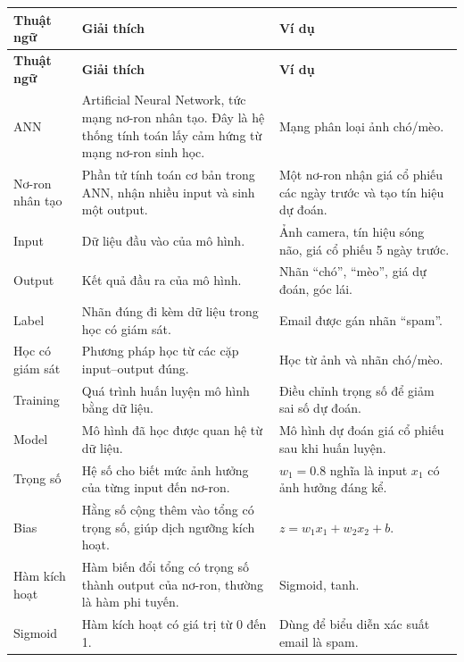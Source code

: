 \small
\begin{longtable}{p{}p{}p{}}
\toprule
\textbf{Thuật ngữ} & \textbf{Giải thích} & \textbf{Ví dụ} \\
\midrule
\endfirsthead

\toprule
\textbf{Thuật ngữ} & \textbf{Giải thích} & \textbf{Ví dụ} \\
\midrule
\endhead

ANN & Artificial Neural Network, tức mạng nơ-ron nhân tạo. Đây là hệ thống tính toán lấy cảm hứng từ mạng nơ-ron sinh học. & Mạng phân loại ảnh chó/mèo. \\

Nơ-ron nhân tạo & Phần tử tính toán cơ bản trong ANN, nhận nhiều input và sinh một output. & Một nơ-ron nhận giá cổ phiếu các ngày trước và tạo tín hiệu dự đoán. \\

Input & Dữ liệu đầu vào của mô hình. & Ảnh camera, tín hiệu sóng não, giá cổ phiếu 5 ngày trước. \\

Output & Kết quả đầu ra của mô hình. & Nhãn ``chó'', ``mèo'', giá dự đoán, góc lái. \\

Label & Nhãn đúng đi kèm dữ liệu trong học có giám sát. & Email được gán nhãn ``spam''. \\

Học có giám sát & Phương pháp học từ các cặp input--output đúng. & Học từ ảnh và nhãn chó/mèo. \\

Training & Quá trình huấn luyện mô hình bằng dữ liệu. & Điều chỉnh trọng số để giảm sai số dự đoán. \\

Model & Mô hình đã học được quan hệ từ dữ liệu. & Mô hình dự đoán giá cổ phiếu sau khi huấn luyện. \\

Trọng số & Hệ số cho biết mức ảnh hưởng của từng input đến nơ-ron. & $w_1=0.8$ nghĩa là input $x_1$ có ảnh hưởng đáng kể. \\

Bias & Hằng số cộng thêm vào tổng có trọng số, giúp dịch ngưỡng kích hoạt. & $z=w_1x_1+w_2x_2+b$. \\

Hàm kích hoạt & Hàm biến đổi tổng có trọng số thành output của nơ-ron, thường là hàm phi tuyến. & Sigmoid, tanh. \\

Sigmoid & Hàm kích hoạt có giá trị từ 0 đến 1. & Dùng để biểu diễn xác suất email là spam. \\


\end{longtable}
